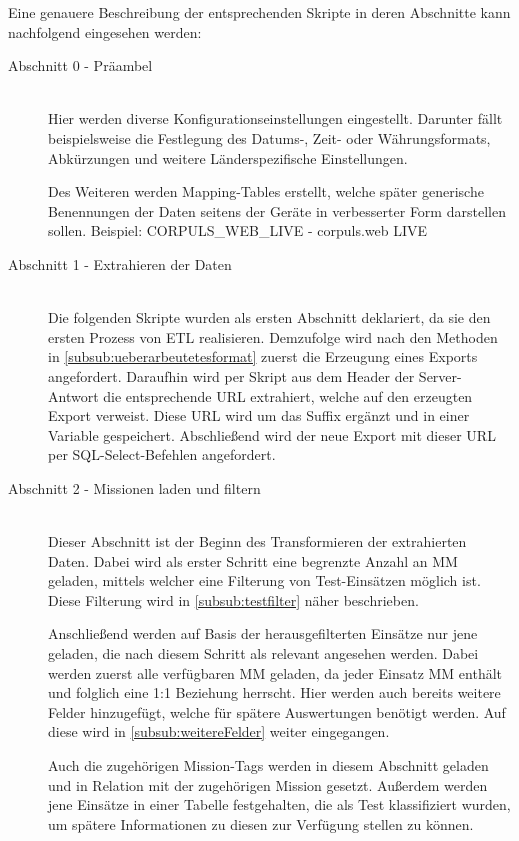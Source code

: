 Eine genauere Beschreibung der entsprechenden Skripte in deren Abschnitte kann nachfolgend eingesehen werden:
\begin{description}
\item[Abschnitt 0 - Präambel] \hfill \\
Hier werden diverse Konfigurationseinstellungen eingestellt.
Darunter fällt beispielsweise die Festlegung des Datums-, Zeit- oder Währungsformats, Abkürzungen und weitere Länderspezifische Einstellungen.

Des Weiteren werden Mapping-Tables erstellt, welche später generische Benennungen der Daten seitens der Geräte in verbesserter Form darstellen sollen. 
Beispiel: CORPULS\_WEB\_LIVE - corpuls.web LIVE

\item[Abschnitt 1 - Extrahieren der Daten]  \hfill \\
Die folgenden Skripte wurden als ersten Abschnitt deklariert, da sie den ersten Prozess von \gls{ETL} realisieren.
Demzufolge wird nach den Methoden in \ref{subsub:ueberarbeutetesformat} zuerst die Erzeugung eines Exports angefordert.
Daraufhin wird per Skript aus dem Header der Server-Antwort die entsprechende URL extrahiert, welche auf den erzeugten Export verweist.
Diese URL wird um das Suffix  ergänzt und in einer Variable gespeichert.
Abschließend wird der neue Export mit dieser URL per SQL-Select-Befehlen angefordert.

\item[Abschnitt 2 - Missionen laden und filtern] \hfill \\
Dieser Abschnitt ist der Beginn des Transformieren der extrahierten Daten.
Dabei wird als erster Schritt eine begrenzte Anzahl an \gls{MM} geladen, mittels welcher eine Filterung von Test-Einsätzen möglich ist.
Diese Filterung wird in \ref{subsub:testfilter} näher beschrieben.

Anschließend werden auf Basis der herausgefilterten Einsätze nur jene geladen, die nach diesem Schritt als relevant angesehen werden.
Dabei werden zuerst alle verfügbaren \gls{MM} geladen, da jeder Einsatz MM enthält und folglich eine 1:1 Beziehung herrscht.
Hier werden auch bereits weitere Felder hinzugefügt, welche für spätere Auswertungen benötigt werden.
Auf diese wird in \ref{subsub:weitereFelder} weiter eingegangen.

Auch die zugehörigen \glqq Mission-Tags\grqq{} werden in diesem Abschnitt geladen und in Relation mit der zugehörigen Mission gesetzt.
Außerdem werden jene Einsätze in einer Tabelle festgehalten, die als \glqq Test\grqq{} klassifiziert wurden, um spätere Informationen zu diesen zur Verfügung stellen zu können.


\end{description}
